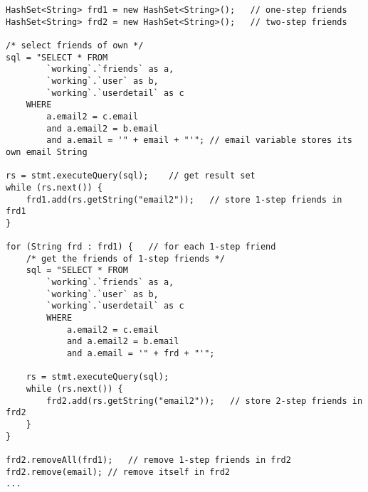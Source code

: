 \begin{lstlisting}
HashSet<String> frd1 = new HashSet<String>();	// one-step friends
HashSet<String> frd2 = new HashSet<String>();	// two-step friends

/* select friends of own */
sql = "SELECT * FROM
		`working`.`friends` as a,
		`working`.`user` as b,
		`working`.`userdetail` as c
	WHERE
		a.email2 = c.email
		and a.email2 = b.email
		and a.email = '" + email + "'"; // email variable stores its own email String

rs = stmt.executeQuery(sql);	// get result set
while (rs.next()) {
	frd1.add(rs.getString("email2"));	// store 1-step friends in frd1
}

for (String frd : frd1) {	// for each 1-step friend
	/* get the friends of 1-step friends */
	sql = "SELECT * FROM
		`working`.`friends` as a,
		`working`.`user` as b,
		`working`.`userdetail` as c
		WHERE
			a.email2 = c.email
			and a.email2 = b.email
			and a.email = '" + frd + "'";

	rs = stmt.executeQuery(sql);
	while (rs.next()) {
		frd2.add(rs.getString("email2"));	// store 2-step friends in frd2
	}
}

frd2.removeAll(frd1);	// remove 1-step friends in frd2
frd2.remove(email);	// remove itself in frd2
...
\end{lstlisting}
